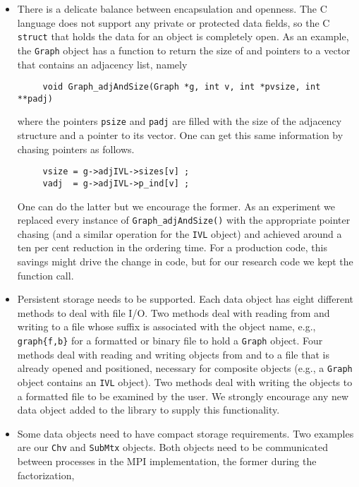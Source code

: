 \begin{itemize}
\item
There is a delicate balance between encapsulation and openness.
The C language does not support any private or protected data
fields, so the C {\tt struct} that holds the data for an object
is completely open.
As an example, the {\tt Graph} object has a function to return the
size of and pointers to a vector that contains an adjacency list,
namely
\begin{verbatim}
     void Graph_adjAndSize(Graph *g, int v, int *pvsize, int **padj)
\end{verbatim}
where the pointers {\tt psize} and {\tt padj} are filled with the
size of the adjacency structure and a pointer to its vector.
One can get this same information by chasing pointers as follows.
\begin{verbatim}
     vsize = g->adjIVL->sizes[v] ;
     vadj  = g->adjIVL->p_ind[v] ;
\end{verbatim}
One can do the latter but we encourage the former.
As an experiment we replaced every instance of 
{\tt Graph\_adjAndSize()} with the appropriate pointer chasing
(and a similar operation for the {\tt IVL} object) and achieved
around a ten per cent reduction in the ordering time.
For a production code, this savings might drive the change in code,
but for our research code we kept the function call.
\item
Persistent storage needs to be supported.
Each data object has eight different methods to deal with file I/O.
Two methods deal with reading from and writing to a file whose
suffix is associated with the object name, e.g., {\tt *graph\{f,b\}}
for a formatted or binary file to hold a {\tt Graph} object.
Four methods deal with reading and writing objects from and to a
file that is already opened and positioned, necessary for composite
objects (e.g., a {\tt Graph} object contains an {\tt IVL} object).
Two methods deal with writing the objects to a formatted file to be
examined by the user.
We strongly encourage any new data object added to the library to 
supply this functionality.
\item
Some data objects need to have compact storage requirements.
Two examples are our {\tt Chv} and {\tt SubMtx} objects.
Both objects need to be communicated between processes
in the MPI implementation, the former during the factorization,

\end{itemize}
